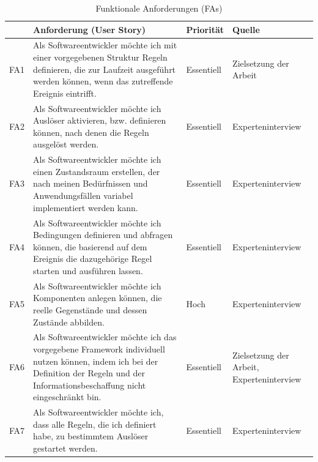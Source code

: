     \begin{table}[hbt!]
        \begin{center}
            \begin{tabular}{ | p{0.6cm} | p{9.5cm} | p{1.6cm} | p{3.1cm} | }
                \hline
                    \textbf{} & \textbf{Anforderung (User Story)} & \textbf{Priorität} & \textbf{Quelle} \\
                \hline
                    FA1 & Als Softwareentwickler möchte ich mit einer vorgegebenen Struktur Regeln definieren, die zur Laufzeit ausgeführt werden können, wenn das zutreffende Ereignis eintrifft. & Essentiell & Zielsetzung der Arbeit \\
                \hline
                    FA2 & Als Softwareentwickler möchte ich Auslöser aktivieren, bzw. definieren können, nach denen die Regeln ausgelöst werden. & Essentiell & Experteninterview \\
                \hline
                    FA3 & Als Softwareentwickler möchte ich einen Zustandsraum erstellen, der nach meinen Bedürfnissen und Anwendungsfällen variabel implementiert werden kann. & Essentiell & Experteninterview \\ 
                \hline
                    FA4 & Als Softwareentwickler möchte ich Bedingungen definieren und abfragen können, die basierend auf dem Ereignis die dazugehörige Regel starten und ausführen lassen. & Essentiell & Experteninterview \\ 
                \hline
                    FA5 & Als Softwareentwickler möchte ich Komponenten anlegen können, die reelle Gegenstände und dessen Zustände abbilden. & Hoch & Experteninterview \\
                \hline
                    FA6 & Als Softwareentwickler möchte ich das vorgegebene Framework individuell nutzen können, indem ich bei der Definition der Regeln und der Informationsbeschaffung nicht eingeschränkt bin. & Essentiell & Zielsetzung der Arbeit, Experteninterview \\
                \hline
                    FA7 & Als Softwareentwickler möchte ich, dass alle Regeln, die ich definiert habe, zu bestimmtem Auslöser gestartet werden. & Essentiell & Experteninterview \\ 
                \hline
            \end{tabular}
        \end{center}
        \caption{Funktionale Anforderungen (FAs)}
        \label{tab:functionalRequirements}
    \end{table}

